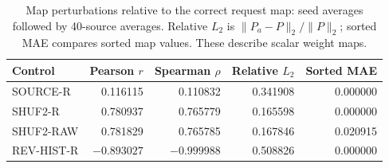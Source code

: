 \begin{table}[!t]
\centering\footnotesize
\caption{Map perturbations relative to the correct request map: seed averages followed by 40-source averages. Relative $L_2$ is $\|P_a-P\|_2/\|P\|_2$; sorted MAE compares sorted map values. These describe scalar weight maps.}
\label{tab:map-controls}
\begin{tabular}{lrrrr}
\toprule
Control & Pearson $r$ & Spearman $\rho$ & Relative $L_2$ & Sorted MAE\\
\midrule
SOURCE-R & 0.116115 & 0.110832 & 0.341908 & 0.000000 \\
SHUF2-R & 0.780937 & 0.765779 & 0.165598 & 0.000000 \\
SHUF2-RAW & 0.781829 & 0.765785 & 0.167846 & 0.020915 \\
REV-HIST-R & $-0.893027$ & $-0.999988$ & 0.508826 & 0.000000 \\
\bottomrule
\end{tabular}
\end{table}
